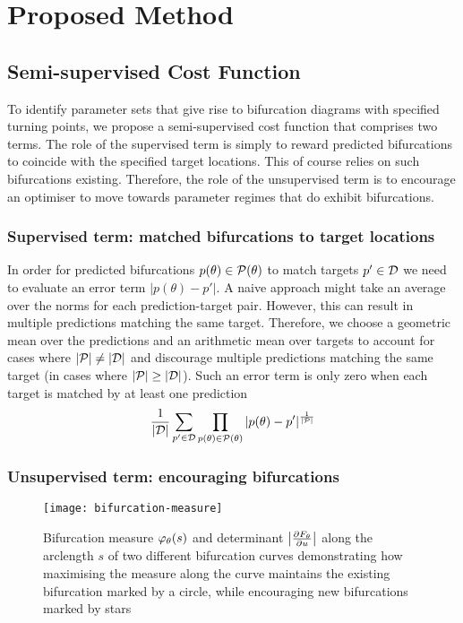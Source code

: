 \clearpage
\section{Proposed Method}
\label{section:method}
\subsection{Semi-supervised Cost Function}

To identify parameter sets that give rise to bifurcation diagrams with specified turning points, we propose a semi-supervised cost function that comprises two terms. The role of the supervised term is simply to reward predicted bifurcations to coincide with the specified target locations. This of course relies on such bifurcations existing. Therefore, the role of the unsupervised term is to encourage an optimiser to move towards parameter regimes that do exhibit bifurcations.

\subsubsection{Supervised term: matched bifurcations to target locations}

In order for predicted bifurcations $p(\theta)\in\mathcal{P}(\theta)$ to match targets $p'\in\mathcal{D}$ we need to evaluate an error term $|p(\theta)-p'|$. A naive approach might take an average over the norms for each prediction-target pair. However, this can result in multiple predictions matching the same target. Therefore, we choose a geometric mean over the predictions and an arithmetic mean over targets to account for cases where $|\mathcal{P}|\neq|\mathcal{D}|$ and discourage multiple predictions matching the same target (in cases where $|\mathcal{P}|\geq|\mathcal{D}|$). Such an error term is only zero when each target is matched by at least one prediction
\begin{align}
    \frac{1}{|\mathcal{D}|}\sum_{p'\in\mathcal{D}}
    \prod_{p(\theta)\in\mathcal{P}(\theta)}|p(\theta)-p'|
    ^{\frac{1}{|\mathcal{P}|}}
    \label{eq:error}
\end{align}

\subsubsection{Unsupervised term: encouraging bifurcations}
\begin{wrapfigure}{r}{7cm}
    \centering
    \texttt{[image: bifurcation-measure]}
    \caption{Bifurcation measure $\varphi_{\theta}(s)$ and determinant $\left| \frac{\partial F_{\theta}}{\partial u} \right|$ along the arclength $s$ of two different bifurcation curves demonstrating how maximising the measure along the curve maintains the existing bifurcation marked by a circle, while encouraging new bifurcations marked by stars}
    \label{fig:measure}
\end{wrapfigure}

